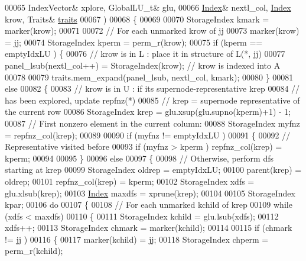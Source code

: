 \begin{DoxyCode}
00065                    IndexVector& xplore, GlobalLU\_t& glu,
00066                    \hyperlink{namespace_eigen_a62e77e0933482dafde8fe197d9a2cfde}{Index}& nextl\_col, \hyperlink{namespace_eigen_a62e77e0933482dafde8fe197d9a2cfde}{Index} krow, Traits& \hyperlink{struct_eigen_1_1internal_1_1traits}{traits}
00067                   )
00068 \{
00069   
00070   StorageIndex kmark = marker(krow);
00071       
00072   \textcolor{comment}{// For each unmarked krow of jj}
00073   marker(krow) = jj; 
00074   StorageIndex kperm = perm\_r(krow); 
00075   \textcolor{keywordflow}{if} (kperm == emptyIdxLU ) \{
00076     \textcolor{comment}{// krow is in L : place it in structure of L(*, jj)}
00077     panel\_lsub(nextl\_col++) = StorageIndex(krow);  \textcolor{comment}{// krow is indexed into A}
00078     
00079     traits.mem\_expand(panel\_lsub, nextl\_col, kmark);
00080   \}
00081   \textcolor{keywordflow}{else} 
00082   \{
00083     \textcolor{comment}{// krow is in U : if its supernode-representative krep}
00084     \textcolor{comment}{// has been explored, update repfnz(*)}
00085     \textcolor{comment}{// krep = supernode representative of the current row}
00086     StorageIndex krep = glu.xsup(glu.supno(kperm)+1) - 1; 
00087     \textcolor{comment}{// First nonzero element in the current column:}
00088     StorageIndex myfnz = repfnz\_col(krep); 
00089     
00090     \textcolor{keywordflow}{if} (myfnz != emptyIdxLU )
00091     \{
00092       \textcolor{comment}{// Representative visited before}
00093       \textcolor{keywordflow}{if} (myfnz > kperm ) repfnz\_col(krep) = kperm; 
00094       
00095     \}
00096     \textcolor{keywordflow}{else} 
00097     \{
00098       \textcolor{comment}{// Otherwise, perform dfs starting at krep}
00099       StorageIndex oldrep = emptyIdxLU; 
00100       parent(krep) = oldrep; 
00101       repfnz\_col(krep) = kperm; 
00102       StorageIndex xdfs =  glu.xlsub(krep); 
00103       \hyperlink{namespace_eigen_a62e77e0933482dafde8fe197d9a2cfde}{Index} maxdfs = xprune(krep); 
00104       
00105       StorageIndex kpar;
00106       \textcolor{keywordflow}{do} 
00107       \{
00108         \textcolor{comment}{// For each unmarked kchild of krep}
00109         \textcolor{keywordflow}{while} (xdfs < maxdfs) 
00110         \{
00111           StorageIndex kchild = glu.lsub(xdfs); 
00112           xdfs++; 
00113           StorageIndex chmark = marker(kchild); 
00114           
00115           \textcolor{keywordflow}{if} (chmark != jj ) 
00116           \{
00117             marker(kchild) = jj; 
00118             StorageIndex chperm = perm\_r(kchild); 

\end{DoxyCode}
